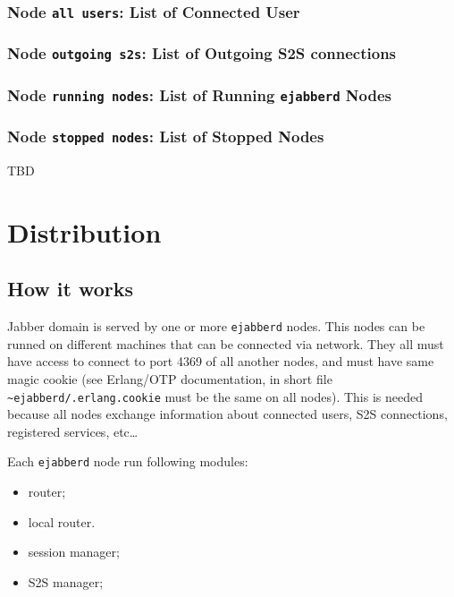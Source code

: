 \documentclass[10pt]{article}
\newcommand{\ejabberd}{\texttt{ejabberd}}
\newcommand{\Jabber}{Jabber}
\begin{document}
\subsubsection{Node \texttt{all users}: List of Connected User}

\subsubsection{Node \texttt{outgoing s2s}: List of Outgoing S2S connections}

\subsubsection{Node \texttt{running nodes}: List of Running \ejabberd{} Nodes}

\subsubsection{Node \texttt{stopped nodes}: List of Stopped Nodes}







TBD

\section{Distribution}
\label{sec:distribution}


\subsection{How it works}
\label{sec:howitworks}

\Jabber{} domain is served by one or more \ejabberd{} nodes.  This nodes can be
runned on different machines that can be connected via network.  They all must
have access to connect to port 4369 of all another nodes, and must have same
magic cookie (see Erlang/OTP documentation, in short file
\texttt{\~{}ejabberd/.erlang.cookie} must be the same on all nodes).  This is
needed because all nodes exchange information about connected users, S2S
connections, registered services, etc\ldots

Each \ejabberd{} node run following modules:
\begin{itemize}
\item router;
\item local router.
\item session manager;
\item S2S manager;
\end{itemize}
\end{document}
